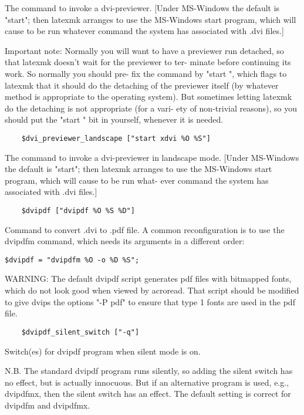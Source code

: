 The command to invoke a dvi-previewer.   [Under  MS-Windows  the
default  is "start"; then latexmk arranges to use the MS-Windows
start program, which will cause to be run whatever  command  the
system has associated with .dvi files.]

Important  note:  Normally you will want to have a previewer run
detached, so that latexmk doesn't wait for the previewer to ter-
minate  before continuing its work.  So normally you should pre-
fix the command by "start ", which  flags  to  latexmk  that  it
should  do  the  detaching  of the previewer itself (by whatever
method is appropriate to the operating system).   But  sometimes
letting latexmk do the detaching is not appropriate (for a vari-
ety of non-trivial reasons), so you should put the "start "  bit
in yourself, whenever it is needed.

\begin{verbatim}
	$dvi_previewer_landscape ["start xdvi %O %S"]
\end{verbatim}

The command to invoke a dvi-previewer in landscape mode.  [Under
MS-Windows the default is "start"; then latexmk arranges to  use
the  MS-Windows  start program, which will cause to be run what-
ever command the system has associated with .dvi files.]

\begin{verbatim}
	$dvipdf ["dvipdf %O %S %D"]
\end{verbatim}

Command to convert .dvi to .pdf file.  A common  reconfiguration
is  to  use  the dvipdfm command, which needs its arguments in a
different order:

\begin{verbatim}
$dvipdf = "dvipdfm %O -o %D %S";
\end{verbatim}

WARNING: The default dvipdf  script  generates  pdf  files  with
bitmapped fonts, which do not look good when viewed by acroread.
That script should be modified to give  dvips  the  options  "-P
pdf" to ensure that type 1 fonts are used in the pdf file.

\begin{verbatim}
	$dvipdf_silent_switch ["-q"]
\end{verbatim}
Switch(es) for dvipdf program when silent mode is on.

N.B.  The  standard  dvipdf program runs silently, so adding the
silent switch has no effect, but is actually innocuous.  But  if
an  alternative program is used, e.g., dvipdfmx, then the silent
switch has an  effect.   The  default  setting  is  correct  for
dvipdfm and dvipdfmx.

